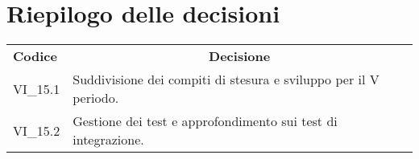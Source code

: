 % 
\section{Riepilogo delle decisioni}
\begin{longtable} {
		>{\centering}p{17mm} 
		>{}p{120mm}}
	\rowcolor{gray!50}
	\textbf{Codice} & \multicolumn{1}{c}{\textbf{Decisione}} \\
	VI\_15.1 & Suddivisione dei compiti di stesura e sviluppo per il V periodo. \TBstrut \\ [2mm]
	VI\_15.2 & Gestione dei test e approfondimento sui test di integrazione. \TBstrut \\ [2mm]
\end{longtable}